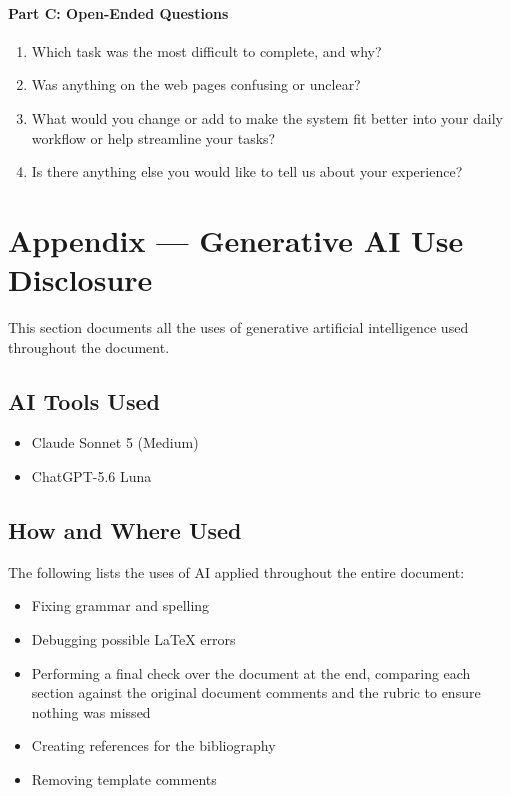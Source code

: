 \documentclass[12pt, titlepage]{article}
\renewcommand{\_}{\oldunderscore\allowbreak}
\begin{document}
\paragraph{Part C: Open-Ended Questions}
\begin{enumerate}[resume]
  \item Which task was the most difficult to complete, and why?
  \item Was anything on the web pages confusing or unclear?
  \item What would you change or add to make the system fit better into your daily workflow or help streamline your tasks?
  \item Is there anything else you would like to tell us about your experience?
\end{enumerate}

\newpage{}

\section{Appendix --- Generative AI Use Disclosure}

This section documents all the uses of generative artificial intelligence used throughout the document.

\subsection{AI Tools Used}

\begin{itemize}
  \item Claude Sonnet 5 (Medium)
  \item ChatGPT-5.6 Luna
\end{itemize}

\subsection{How and Where Used}
The following lists the uses of AI applied throughout the entire document:
\begin{itemize}
  \item Fixing grammar and spelling
  \item Debugging possible \LaTeX{} errors
  \item Performing a final check over the document at the end, comparing each section against the original document comments and the rubric to ensure nothing was missed
  \item Creating references for the bibliography
  \item Removing template comments
\end{itemize}
\end{document}
